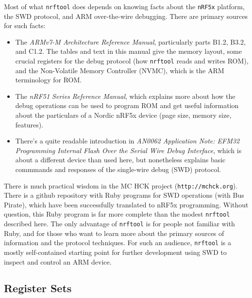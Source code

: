 \documentclass{article}
\begin{document}
Most of what \texttt{nrftool} does depends on knowing facts about the \texttt{nRF5x} platform,
the SWD protocol, and ARM over-the-wire debugging. There are primary sources for such facts:
\begin{itemize}
\item The \emph{ARMv7-M Architecture Reference Manual}, particularly parts B1.2, B3.2, and C1.2.
The tables and text in this manual give the memory layout, some crucial registers for the debug
protocol (how \texttt{nrftool} reads and writes ROM), and the Non-Volatile Memory Controller
(NVMC), which is the ARM terminology for ROM.  
\item The \emph{nRF51 Series Reference Manual}, which explains more about how the debug operations
can be used to program ROM and get useful information about the particulars of a Nordic nRF5x 
device (page size, memory size, features). 
\item There's a quite readable introduction in \emph{AN0062 Application Note: EFM32 Programming 
Internal Flash Over the Serial Wire Debug Interface}, which is about a different device than
used here, but nonetheless explains basic commmands and responses of the single-wire debug 
(SWD) protocol.
\end{itemize}
There is much practical wisdom in the \textsc{MC HCK} project (\texttt{http://mchck.org}). There
is a github repository with Ruby programs for SWD operations (with Bus Pirate), which have been successfully 
translated to nRF5x programming. Without question, this Ruby program is far more complete than
the modest \texttt{nrftool} described here. The only advantage of \texttt{nrftool} is 
for people not familiar with Ruby, and for those who want to learn more about the primary sources
of information and the protocol techniques.  For such an audience, \texttt{nrftool} is a mostly 
self-contained starting point for further development using SWD to inspect and control an ARM device.

\subsection*{Register Sets}
\end{document}

